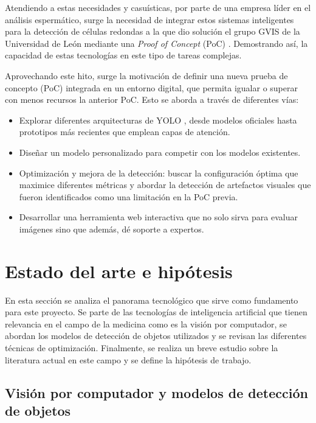 \documentclass[12pt,a4paper,onecolumn,oneside]{report}
\begin{document}
Atendiendo a estas necesidades y casuísticas, por parte de una empresa líder en el análisis espermático, surge la necesidad de integrar estos sistemas inteligentes para la detección de células redondas a la que dio solución el grupo GVIS de la 
Universidad de León mediante una \textit{Proof of Concept} (PoC) \cite{HamiltonThorneRoundCells}. Demostrando así, la capacidad de estas tecnologías en este tipo de tareas complejas.

Aprovechando este hito, surge la motivación de definir una nueva prueba de concepto (PoC) integrada en un entorno digital, que permita igualar o superar con menos recursos la anterior PoC. Esto se aborda a través de diferentes vías:

\begin{itemize}
  \item Explorar diferentes arquitecturas de YOLO \cite{ultralytics_models}, desde modelos oficiales hasta prototipos más recientes que emplean capas de atención. 
  \item Diseñar un modelo personalizado para competir con los modelos existentes.
  \item Optimización y mejora de la detección: buscar la configuración óptima que maximice diferentes métricas y abordar la detección de artefactos visuales que fueron identificados como una limitación en la PoC previa. 
  \item Desarrollar una herramienta web interactiva que no solo sirva para evaluar imágenes sino que además, dé soporte a expertos.
\end{itemize}

\section{Estado del arte e hipótesis}
\label{sec:Estado del arte e hipótesis}

En esta sección se analiza el panorama tecnológico que sirve como fundamento para este proyecto. Se parte de las tecnologías de inteligencia artificial que tienen relevancia en el campo de la medicina como es la 
visión por computador, se abordan los modelos de detección de objetos utilizados y se revisan las diferentes técnicas de optimización. Finalmente, se realiza un breve estudio sobre la literatura actual 
en este campo y se define la hipótesis de trabajo.

\subsection{Visión por computador y modelos de detección de objetos}
\label{sec:Arquitecturas}
\end{document}
